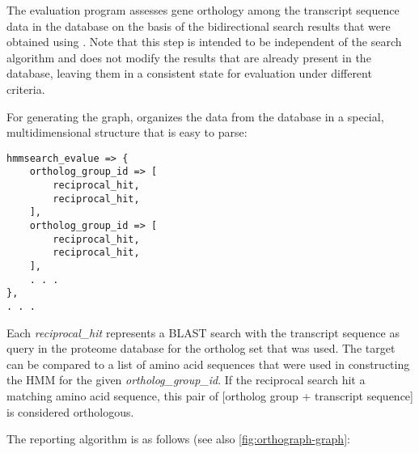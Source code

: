 \label{sec:algorithm-reporting}
The evaluation program  assesses gene orthology among
the transcript sequence data in the database on the basis of the bidirectional
search results that were obtained using . Note that
this step is intended to be independent of the search algorithm and does not
modify the results that are already present in the database, leaving them in a
consistent state for evaluation under different criteria.

For generating the graph,  organizes the data from the
database in a special, multidimensional structure that is easy to parse:

\begin{lstlisting}[label={lst:structure},caption={Data structure for parsing the triangular
relationships between ortholog groups and transcripts}]
hmmsearch_evalue => {
	ortholog_group_id => [
		reciprocal_hit,
		reciprocal_hit,
	],
	ortholog_group_id => [
		reciprocal_hit,
		reciprocal_hit,
	],
	. . .
},
. . .
\end{lstlisting}

Each \emph{reciprocal\_hit} represents a BLAST search with the transcript
sequence as query in the proteome database for the ortholog set that was used.
The target can be compared to a list of amino acid sequences that were used in
constructing the HMM for the given \emph{ortholog\_group\_id}. If the reciprocal
search hit a matching amino acid sequence, this pair of [ortholog group +
transcript sequence] is considered orthologous.

The reporting algorithm is as follows (see also \autoref{fig:orthograph-graph}:

